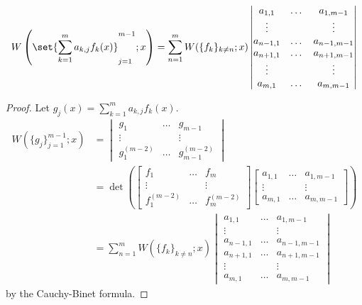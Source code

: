 \documentclass{article}
\begin{document}
\begin{lemma}
\begin{equation*}
\W{ \set{ \sum_{k=1}^m a_{k,j} f_k(x) }_{j=1}^{m-1} }{ x} = \sum_{n=1}^m W(\{f_k\}_{k\neq n} ; x) \begin{vmatrix}
a_{1,1} & \dots & a_{1,m-1} \\
\vdots & & \vdots \\
a_{n-1,1} & \dots & a_{n-1,m-1} \\
a_{n+1,1} & \dots & a_{n+1,m-1} \\
\vdots & & \vdots \\
a_{m,1} & \dots & a_{m,m-1}
\end{vmatrix}
\end{equation*}
\label{lem:sum}
\end{lemma}

\begin{proof}
Let $g_j(x) = \sum_{k=1}^m a_{k,j} f_k(x)$.
\begin{align*}
W(\{g_j\}_{j=1}^{m-1} ; x) & = \begin{vmatrix}
g_1 & \dots & g_{m-1} \\
\vdots & & \vdots \\
g_1^{(m-2)} & \dots & g_{m-1}^{(m-2)} \end{vmatrix} \\
& = \det \left ( \begin{bmatrix} f_1 & \dots & f_m \\ \vdots & & \vdots \\ f_1^{(m-2)} & \dots & f_m^{(m-2)} \end{bmatrix} \begin{bmatrix} a_{1,1} & \dots & a_{1,m-1} \\ \vdots & & \vdots \\ a_{m,1} & \dots & a_{m,m-1} \end{bmatrix} \right ) \\
& = \sum_{n=1}^{m} W(\{f_k\}_{k\neq n} ; x) \begin{vmatrix}
a_{1,1} & \dots & a_{1,m-1} \\
\vdots & & \vdots \\
a_{n-1,1} & \dots & a_{n-1,m-1} \\
a_{n+1,1} & \dots & a_{n+1,m-1} \\
\vdots & & \vdots \\
a_{m,1} & \dots & a_{m,m-1}
\end{vmatrix}
\end{align*}
by the Cauchy-Binet formula.
\end{proof}
\end{document}

